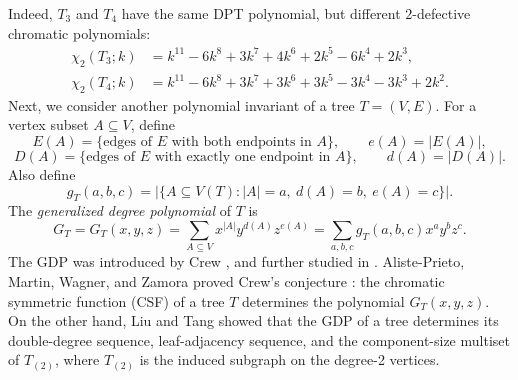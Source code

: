 \documentclass[12pt,reqno]{amsart}
\theoremstyle{definition}
\begin{document}
\begin{center}
\hspace{1.5cm}
\end{center}

Indeed, $T_3$ and $T_4$ have the same DPT polynomial, but different $2$-defective chromatic polynomials:
\begin{align*}
\chi_2(T_3;k)&=k^{11}-6k^8+3k^7+4k^6+2k^5-6k^4+2k^3, \\ 
\chi_2(T_4;k) &=k^{11}-6k^8+3k^7+3k^6+3k^5-3k^4-3k^3+2k^2.
\end{align*}
Next, we consider another polynomial invariant of a tree $T=(V, E)$. For a vertex subset $A\subseteq V$, define
\[
E(A)=\{\text{edges of }E\text{ with both endpoints in }A\}, \qquad e(A)=|E(A)|,
\]
\[
D(A)=\{\text{edges of }E\text{ with exactly one endpoint in }A\}, \qquad d(A)=|D(A)|.
\]
Also define
\[
g_T(a,b,c)=\bigl|\{A\subseteq V(T): |A|=a,\ d(A)=b,\ e(A)=c\}\bigr|.
\]
The \emph{generalized degree polynomial} of $T$ is
\[
G_T=G_T(x,y,z)=\sum_{A\subseteq V} x^{|A|}y^{d(A)}z^{e(A)}
= \sum_{a,b,c} g_T(a,b,c)x^a y^b z^c.
\]
The GDP was introduced by Crew \cite{Cre20}, and further studied in \cite{Cre22}. Aliste-Prieto, Martin, Wagner, and Zamora \cite{A-PMWZ24} proved Crew's conjecture \cite{Cre22}: the chromatic symmetric function (CSF) of a tree $T$ determines the polynomial $G_T(x, y, z)$. On the other hand, Liu and Tang \cite{LT26} showed that the GDP of a tree determines its double-degree sequence, leaf-adjacency sequence, and the component-size multiset of $T_{(2)}$, where $T_{(2)}$ is the induced subgraph on the degree-2 vertices.
\end{document}
